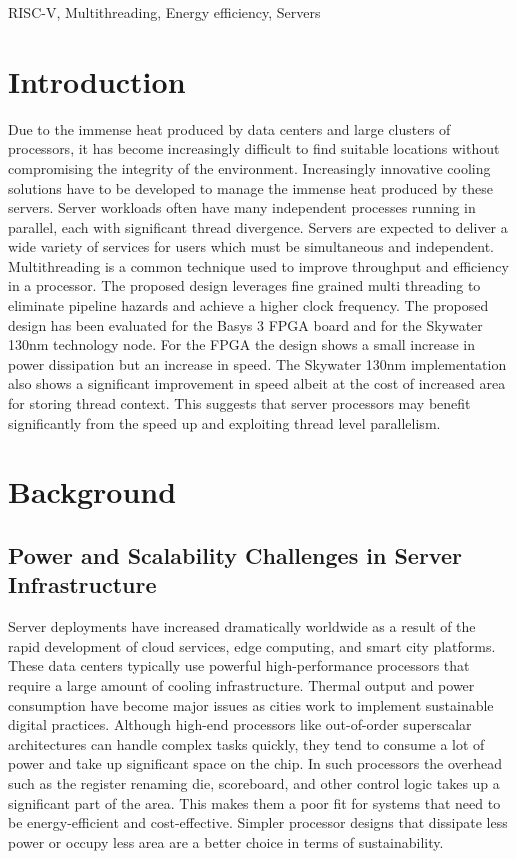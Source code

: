 \documentclass[conference]{IEEEtran}
\begin{document}
\begin{IEEEkeywords}
RISC-V, Multithreading, Energy efficiency, Servers
\end{IEEEkeywords}

\section{Introduction}
Due to the immense heat produced by data centers and large clusters of processors, it has become increasingly difficult to find suitable locations without compromising the integrity of the environment. Increasingly innovative cooling solutions have to be developed to manage the immense heat produced by these servers. Server workloads often have many independent processes running in parallel, each with significant thread divergence. Servers are expected to deliver a wide variety of services for users which must be simultaneous and independent. Multithreading is a common technique used to improve throughput and efficiency in a processor. The proposed design leverages fine grained multi threading to eliminate pipeline hazards and achieve a higher clock frequency. The proposed design has been evaluated for the Basys 3 FPGA board and for the Skywater 130nm technology node. For the FPGA the design shows a small increase in power dissipation but an increase in speed. The Skywater 130nm implementation also shows a significant improvement in speed albeit at the cost of increased area for storing thread context. This suggests that server processors may benefit significantly from the speed up and exploiting thread level parallelism.
\section{Background}

\subsection{Power and Scalability Challenges in Server Infrastructure}

Server deployments have increased dramatically worldwide as a result of the rapid development of cloud services, edge computing, and smart city platforms. These data centers typically use powerful high-performance processors that require a large amount of cooling infrastructure. Thermal output and power consumption have become major issues as cities work to implement sustainable digital practices. Although high-end processors like out-of-order superscalar architectures can handle complex tasks quickly, they tend to consume a lot of power and take up significant space on the chip. In such processors the overhead such as the register renaming die, scoreboard, and other control logic takes up a significant part of the area. This makes them a poor fit for systems that need to be energy-efficient and cost-effective. Simpler processor designs that dissipate less power or occupy less area are a better choice  in terms of sustainability.
\end{document}
